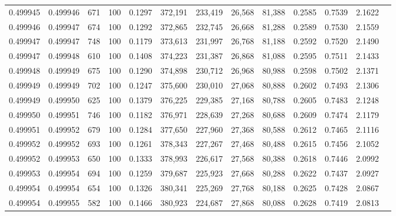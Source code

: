 \begin{tabular}{rrrrrrrrrrrrr}
0.499945 & 0.499946 &   671 & 100 &                                     0.1297 & 372,191 & 233,419 &  26,568 &  81,388 & 0.2585 & 0.7539 & 2.1622 \\
0.499946 & 0.499947 &   674 & 100 &                                     0.1292 & 372,865 & 232,745 &  26,668 &  81,288 & 0.2589 & 0.7530 & 2.1559 \\
0.499947 & 0.499947 &   748 & 100 &                                     0.1179 & 373,613 & 231,997 &  26,768 &  81,188 & 0.2592 & 0.7520 & 2.1490 \\
0.499947 & 0.499948 &   610 & 100 &                                     0.1408 & 374,223 & 231,387 &  26,868 &  81,088 & 0.2595 & 0.7511 & 2.1433 \\
0.499948 & 0.499949 &   675 & 100 &                                     0.1290 & 374,898 & 230,712 &  26,968 &  80,988 & 0.2598 & 0.7502 & 2.1371 \\
0.499949 & 0.499949 &   702 & 100 &                                     0.1247 & 375,600 & 230,010 &  27,068 &  80,888 & 0.2602 & 0.7493 & 2.1306 \\
0.499949 & 0.499950 &   625 & 100 &                                     0.1379 & 376,225 & 229,385 &  27,168 &  80,788 & 0.2605 & 0.7483 & 2.1248 \\
0.499950 & 0.499951 &   746 & 100 &                                     0.1182 & 376,971 & 228,639 &  27,268 &  80,688 & 0.2609 & 0.7474 & 2.1179 \\
0.499951 & 0.499952 &   679 & 100 &                                     0.1284 & 377,650 & 227,960 &  27,368 &  80,588 & 0.2612 & 0.7465 & 2.1116 \\
0.499952 & 0.499952 &   693 & 100 &                                     0.1261 & 378,343 & 227,267 &  27,468 &  80,488 & 0.2615 & 0.7456 & 2.1052 \\
0.499952 & 0.499953 &   650 & 100 &                                     0.1333 & 378,993 & 226,617 &  27,568 &  80,388 & 0.2618 & 0.7446 & 2.0992 \\
0.499953 & 0.499954 &   694 & 100 &                                     0.1259 & 379,687 & 225,923 &  27,668 &  80,288 & 0.2622 & 0.7437 & 2.0927 \\
0.499954 & 0.499954 &   654 & 100 &                                     0.1326 & 380,341 & 225,269 &  27,768 &  80,188 & 0.2625 & 0.7428 & 2.0867 \\
0.499954 & 0.499955 &   582 & 100 &                                     0.1466 & 380,923 & 224,687 &  27,868 &  80,088 & 0.2628 & 0.7419 & 2.0813 \\

\end{tabular}
